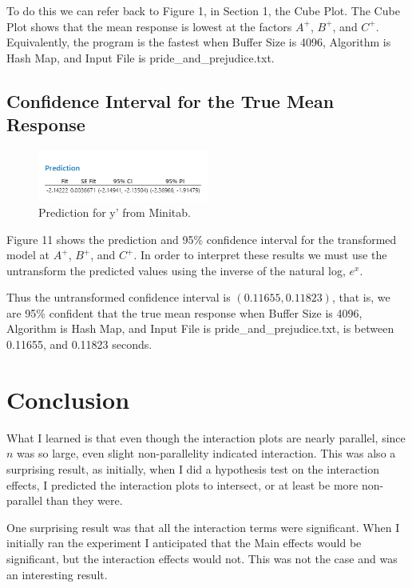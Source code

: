 \documentclass{article}
\begin{document}
To do this we can refer back to Figure 1, in Section 1, the Cube Plot.
The Cube Plot shows that the mean response is lowest at the factors $A^{+}$, $B^{+}$, and $C^{+}$.
Equivalently, the program is the fastest when Buffer Size is 4096, Algorithm is Hash Map, and Input File is pride\_and\_prejudice.txt.

\subsection{Confidence Interval for the True Mean Response}
\begin{figure}[h] %
  \centering
  \includegraphics[width=0.5\textwidth]{./images/transformed/conf.png}
  \caption{Prediction for y' from Minitab.}
  \label{fig:interaction}
\end{figure}
Figure 11 shows the prediction and 95\% confidence interval for the transformed model at $A^{+}$, $B^{+}$, and $C^{+}$.
In order to interpret these results we must use the untransform the predicted values using the inverse of the natural log, $e^x$.

Thus the untransformed confidence interval is $(0.11655, 0.11823)$, that is,
we are 95\% confident that the true mean response when Buffer Size is 4096, Algorithm is Hash Map, and Input File is pride\_and\_prejudice.txt,
is between 0.11655, and 0.11823 seconds.


\section{Conclusion}
What I learned is that even though the interaction plots are nearly parallel, since $n$ was so large, even slight non-parallelity indicated interaction.
This was also a surprising result, as initially, when I did a hypothesis test on the interaction effects, I predicted the interaction plots to intersect, or at least be more non-parallel than they were.

One surprising result was that all the interaction terms were significant. When I initially ran the experiment I anticipated that the Main effects would be significant, but the interaction effects would not. This was not the case and was an interesting result.
\end{document}
